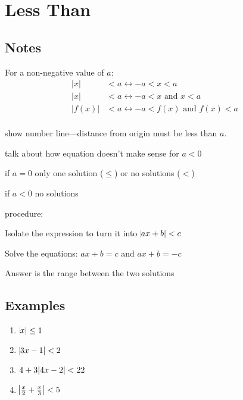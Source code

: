 \documentclass[letterpaper, landscape]{exam}
\begin{document}
  \section{Less Than}

  \subsection{Notes} %
  
  For a non-negative value of $a$:
  \begin{align*}
    |x|    & < a \leftrightarrow -a < x < a \\
    |x|    & < a \leftrightarrow -a < x \text{ and } x < a \\
    |f(x)| & < a \leftrightarrow -a < f(x) \text{ and } f(x) < a \\
  \end{align*}

  \begin{itemize*}
    \item show number line---distance from origin must be less than $a$.
    \item talk about how equation doesn't make sense for $a < 0$
    \item if $a = 0$ only one solution ($\leq$) or no solutions ($<$)
    \item if $a < 0$ no solutions
  \end{itemize*}

  procedure:
  \begin{enumerate*}
    \item Isolate the expression to turn it into $\abs{ ax + b } < c$
    \item Solve the equations: $ax + b = c$ and $ax + b = -c$
    \item Answer is the range between the two solutions
  \end{enumerate*}

  \subsection{Examples} %
  
  \begin{enumerate}
    \item $\abs{ x } \leq 1$

    \item $\abs{ 3x - 1 } < 2$

    \item $4 + 3 \abs{ 4x - 2 } < 22$

    \item $\abs{ \frac{x}{2} + \frac{x}{3} } < 5$

  \end{enumerate}
\end{document}
